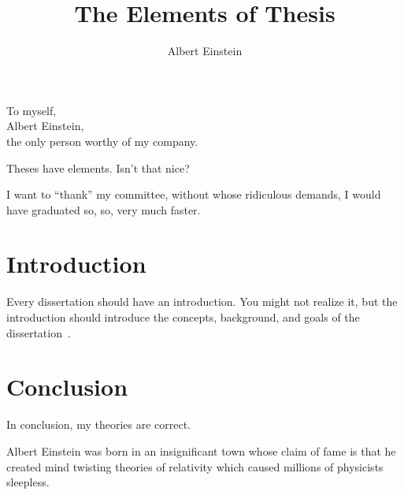 \documentclass{gatech-thesis-modified}
\title{The Elements of Thesis}
\author{Albert Einstein}
\numberwithin{equation}{chapter} %
\numberwithin{figure}{chapter} %
\numberwithin{table}{chapter}
\begin{document}

\begin{preliminary}
\begin{dedication}
\null\vfil
{\large
\begin{center}
To myself,\\\vspace{12pt} Albert Einstein,\\\vspace{12pt} the only
person worthy of my company.
\end{center}}
\vfil\null
\end{dedication}
\begin{preface}
Theses have elements.  Isn't that nice?
\end{preface}
\begin{acknowledgements}
I want to ``thank'' my committee, without whose ridiculous demands, I
would have graduated so, so, very much faster.
\end{acknowledgements}
\contents

\end{preliminary}
\chapter{Introduction}

Every dissertation should have an introduction.  You might not
realize it, but the introduction should introduce the concepts,
background, and goals of the dissertation~\cite{knuth:tex, lamport:latex}.





\chapter{Conclusion}
In conclusion, my theories are correct.
\appendix

\begin{postliminary}
\begin{vita}
Albert Einstein was born in an insignificant town whose claim of
fame is that he created mind twisting theories of relativity
which caused millions of physicists sleepless.
\end{vita}
\end{postliminary}
\end{document}
